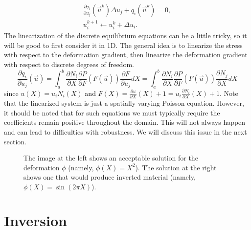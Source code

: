 \begin{gather*}
\frac{\partial q_i}{\partial u_j} \left( \vec{u}^k \right) \Delta{u}_j + q_i \left( \vec{u}^k \right) = 0, \\
u_i^{k+1} \leftarrow u_i^{k} + \Delta{u}_i.
\end{gather*}
The linearization of the discrete equilibrium equations can be a little tricky, so it will be good to first consider it in 1D. The general idea is to linearize the stress with respect to the deformation gradient, then linearize the deformation gradient with respect to discrete degrees of freedom.
\begin{equation*}
\frac{\partial q_i}{\partial u_j} \left( \vec{u} \right) = \int_a^b \frac{\partial N_i}{\partial X} \frac{\partial P}{\partial F} \left( F \left( \vec{u} \right) \right) \frac{\partial F}{\partial u_j} dX = \int_a^b \frac{\partial N_i}{\partial X} \frac{\partial P}{\partial F} \left( F \left( \vec{u} \right) \right) \frac{\partial N_j}{\partial X} dX
\end{equation*}
since $u(X) = u_i N_i(X)$ and $F(X) = \frac{\partial u}{\partial X}(X) + 1 = u_i \frac{\partial N_i}{\partial X}(X) + 1$. Note that the linearized system is just a spatially varying Poisson equation. However, it should be noted that for such equations we must typically require the coefficients remain positive throughout the domain. This will not always happen and can lead to difficulties with robustness. We will discuss this issue in the next section.

\begin{figure}
\caption{The image at the left shows an acceptable solution for the deformation $\phi$ (namely, $\phi(X) = X^2$). The solution at the right shows one that would produce inverted material (namely, $\phi(X) = \sin \left( 2 \pi X \right)$).}
\label{fig:inversion}
\end{figure}

\section*{Inversion}

